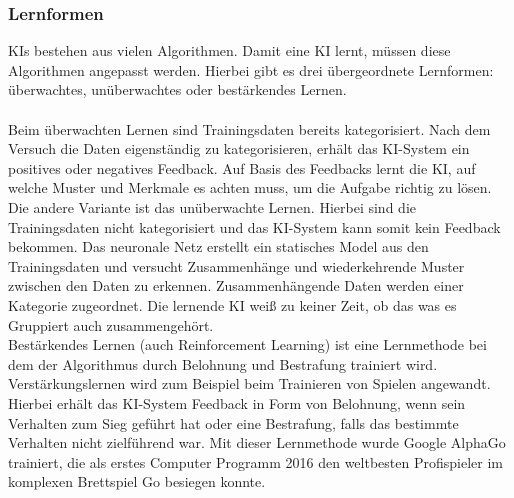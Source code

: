 \documentclass[12pt,oneside,a4paper,parskip]{scrbook}
\begin{document}
\subsubsection{Lernformen}
KIs bestehen aus vielen Algorithmen. Damit eine KI lernt, müssen diese Algorithmen angepasst werden. Hierbei gibt es drei übergeordnete Lernformen: überwachtes, unüberwachtes oder bestärkendes Lernen. \\\\
Beim überwachten Lernen sind Trainingsdaten bereits kategorisiert. Nach dem Versuch die Daten eigenständig zu kategorisieren, erhält das KI-System ein positives oder negatives Feedback. Auf Basis des Feedbacks lernt die KI, auf welche Muster und Merkmale es achten muss, um die Aufgabe richtig zu lösen. \\
Die andere Variante ist das unüberwachte Lernen. Hierbei sind die Trainingsdaten nicht kategorisiert und das KI-System kann somit kein Feedback bekommen. Das neuronale Netz erstellt ein statisches Model aus den Trainingsdaten und versucht Zusammenhänge und wiederkehrende Muster zwischen den Daten zu erkennen. Zusammenhängende Daten werden einer Kategorie zugeordnet. Die lernende KI weiß zu keiner Zeit, ob das was es Gruppiert auch zusammengehört.\\
Bestärkendes Lernen (auch Reinforcement Learning) ist eine Lernmethode bei dem der Algorithmus durch Belohnung und Bestrafung trainiert wird. Verstärkungslernen wird zum Beispiel beim Trainieren von Spielen angewandt. Hierbei erhält das KI-System Feedback in Form von Belohnung, wenn sein Verhalten zum Sieg geführt hat oder eine Bestrafung, falls das bestimmte Verhalten nicht zielführend war. Mit dieser Lernmethode wurde Google AlphaGo trainiert, die als erstes Computer Programm 2016 den weltbesten Profispieler im komplexen Brettspiel Go besiegen konnte.
\end{document}
